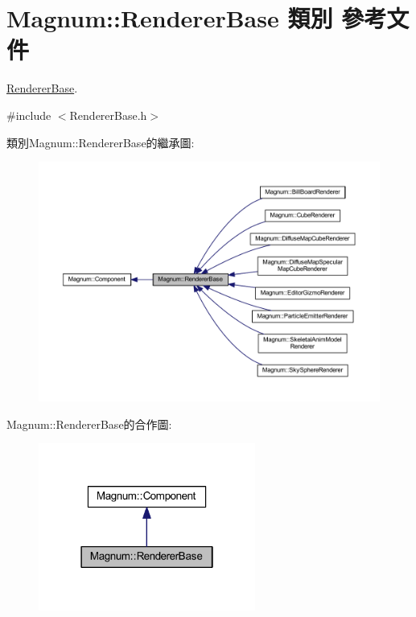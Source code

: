 \hypertarget{class_magnum_1_1_renderer_base}{}\section{Magnum\+:\+:Renderer\+Base 類別 參考文件}
\label{class_magnum_1_1_renderer_base}


\hyperlink{class_magnum_1_1_renderer_base}{Renderer\+Base}.  




{\ttfamily \#include $<$Renderer\+Base.\+h$>$}



類別\+Magnum\+:\+:Renderer\+Base的繼承圖\+:\nopagebreak
\begin{figure}[H]
\begin{center}
\leavevmode
\includegraphics[width=350pt]{class_magnum_1_1_renderer_base__inherit__graph}
\end{center}
\end{figure}


Magnum\+:\+:Renderer\+Base的合作圖\+:\nopagebreak
\begin{figure}[H]
\begin{center}
\leavevmode
\includegraphics[width=202pt]{class_magnum_1_1_renderer_base__coll__graph}
\end{center}
\end{figure}
